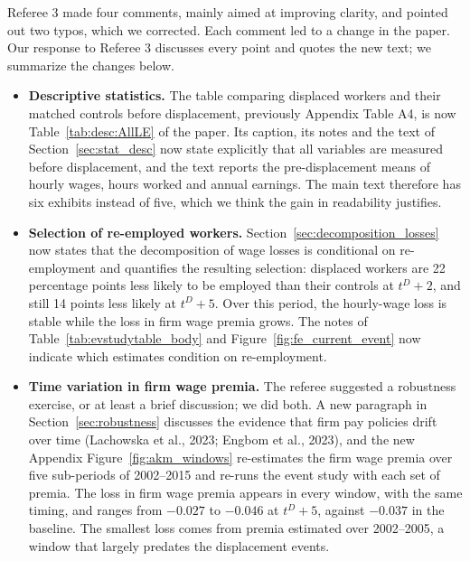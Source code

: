\documentclass[11pt]{article}
\newcommand{\answer}[1]{\begingroup\color{navy}#1\endgroup}
\begin{document}
\answer{Referee 3 made four comments, mainly aimed at improving clarity, and pointed out two typos, which we corrected. Each comment led to a change in the paper. Our response to Referee 3 discusses every point and quotes the new text; we summarize the changes below.

\begin{itemize}[leftmargin=*]
\item \textbf{Descriptive statistics.} The table comparing displaced workers and their matched controls before displacement, previously Appendix Table A4, is now Table~\ref{tab:desc:AllLE} of the paper. Its caption, its notes and the text of Section~\ref{sec:stat_desc} now state explicitly that all variables are measured before displacement, and the text reports the pre-displacement means of hourly wages, hours worked and annual earnings. The main text therefore has six exhibits instead of five, which we think the gain in readability justifies.

\item \textbf{Selection of re-employed workers.} Section~\ref{sec:decomposition_losses} now states that the decomposition of wage losses is conditional on re-employment and quantifies the resulting selection: displaced workers are 22 percentage points less likely to be employed than their controls at $t^D+2$, and still 14 points less likely at $t^D+5$. Over this period, the hourly-wage loss is stable while the loss in firm wage premia grows. The notes of Table~\ref{tab:evstudytable_body} and Figure~\ref{fig:fe_current_event} now indicate which estimates condition on re-employment.

\item \textbf{Time variation in firm wage premia.} The referee suggested a robustness exercise, or at least a brief discussion; we did both. A new paragraph in Section~\ref{sec:robustness} discusses the evidence that firm pay policies drift over time (Lachowska et al., 2023; Engbom et al., 2023), and the new Appendix Figure~\ref{fig:akm_windows} re-estimates the firm wage premia over five sub-periods of 2002--2015 and re-runs the event study with each set of premia. The loss in firm wage premia appears in every window, with the same timing, and ranges from $-0.027$ to $-0.046$ at $t^D+5$, against $-0.037$ in the baseline. The smallest loss comes from premia estimated over 2002--2005, a window that largely predates the displacement events.


\end{itemize}}
\end{document}
